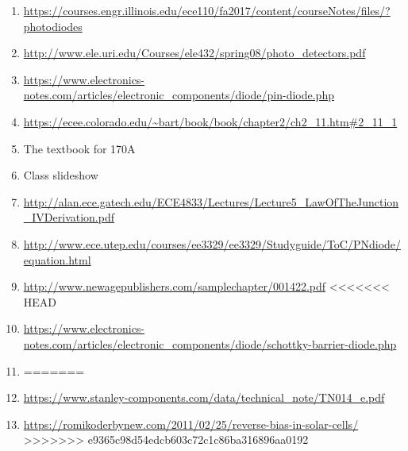 \begin{enumerate}
	\item \label{ref:packaging_pn_diode} \url{https://courses.engr.illinois.edu/ece110/fa2017/content/courseNotes/files/?photodiodes}
	\item \url{http://www.ele.uri.edu/Courses/ele432/spring08/photo_detectors.pdf}
	\item \url{https://www.electronics-notes.com/articles/electronic_components/diode/pin-diode.php}
	\item \label{ref:thermal_eq} \url{https://ecee.colorado.edu/~bart/book/book/chapter2/ch2_11.htm#2_11_1}
	\item \label{ref:carrier_conc_src} The textbook for 170A
	\item \label{ref:slideshow} Class slideshow
	\item \label{ref:law_of_junction} \url{http://alan.ece.gatech.edu/ECE4833/Lectures/Lecture5_LawOfTheJunction_IVDerivation.pdf}
	\item \label{ref:ideal_diode_src} \url{http://www.ece.utep.edu/courses/ee3329/ee3329/Studyguide/ToC/PNdiode/equation.html}
	\item \label{ref:pn-plot-src} \url{http://www.newagepublishers.com/samplechapter/001422.pdf}
<<<<<<< HEAD
	\item \label{ref:schottky_diode_src}
	\url{https://www.electronics-notes.com/articles/electronic_components/diode/schottky-barrier-diode.php}
	\item \label{ref:zener_reg}
=======
	\item \url{https://www.stanley-components.com/data/technical_note/TN014_e.pdf}
	\item \url{https://romikoderbynew.com/2011/02/25/reverse-bias-in-solar-cells/}
>>>>>>> e9365c98d54edcb603c72c1c86ba316896aa0192
\end{enumerate}
